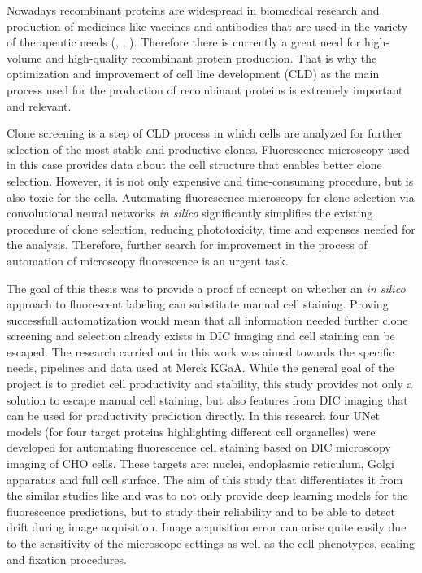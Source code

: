 Nowadays recombinant proteins are widespread in biomedical research and production of medicines like vaccines and antibodies that are used in the variety of therapeutic needs (\cite{Liu_2022}, \cite{Kim_2011}, \cite{Jayapal_2007}). Therefore there is currently a great need for high-volume and high-quality recombinant protein production. That is why the optimization and improvement of cell line development (CLD) as the main process used for the production of recombinant proteins is extremely important and relevant.

Clone screening is a step of CLD process in which cells are analyzed for further selection of the most stable and productive clones. Fluorescence microscopy used in this case provides data about the cell structure that enables better clone selection. However, it is not only expensive and time-consuming procedure, but is also toxic for the cells. Automating fluorescence microscopy for clone selection via convolutional neural networks \textit{in silico} significantly simplifies the existing procedure of clone selection, reducing phototoxicity, time and expenses needed for the analysis. Therefore, further search for improvement in the process of automation of microscopy fluorescence is an urgent task.

The goal of this thesis was to provide a proof of concept on whether an \textit{in silico} approach to fluorescent labeling can substitute manual cell staining. Proving successfull automatization would mean that all information needed further clone screening and selection already exists in DIC imaging and cell staining can be escaped. The research carried out in this work was aimed towards the specific needs, pipelines and data used at Merck KGaA. While the general goal of the project is to predict cell productivity and stability, this study provides not only a solution to escape manual cell staining, but also features from DIC imaging that can be used for productivity prediction directly. In this research four UNet models (for four target proteins highlighting different cell organelles) were developed for automating fluorescence cell staining based on DIC microscopy imaging of CHO cells. These targets are: nuclei, endoplasmic reticulum, Golgi apparatus and full cell surface. The aim of this study that differentiates it from the similar studies like \cite{Lachance_2020} and \cite{Christiansen_2018} was to not only provide deep learning models for the fluorescence predictions, but to study their reliability and to be able to detect drift during image acquisition. Image acquisition error can arise quite easily due to the sensitivity of the microscope settings as well as the cell phenotypes, scaling and fixation procedures.

